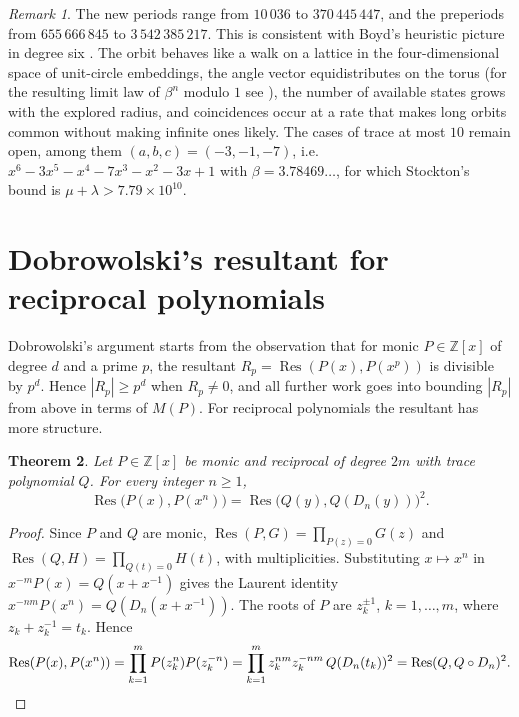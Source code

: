 \documentclass[11pt]{amsart}
\newtheorem{theorem}{Theorem}[section]
\theoremstyle{definition}
\theoremstyle{remark}
\newtheorem{remark}[theorem]{Remark}
\DeclareMathOperator{\Res}{Res}
\newcommand{\Z}{\mathbb Z}
\begin{document}
\begin{remark}
The new periods range from $10\,036$ to $370\,445\,447$, and the preperiods from $655\,666\,845$ to $3\,542\,385\,217$. This is consistent with Boyd's heuristic picture in degree six \cite{Boyd96}. The orbit behaves like a walk on a lattice in the four-dimensional space of unit-circle embeddings, the angle vector equidistributes on the torus (for the resulting limit law of $\beta^n$ modulo $1$ see \cite{AkiyamaTanigawa}), the number of available states grows with the explored radius, and coincidences occur at a rate that makes long orbits common without making infinite ones likely. The cases of trace at most $10$ remain open, among them $(a,b,c)=(-3,-1,-7)$, i.e.\ $x^6-3x^5-x^4-7x^3-x^2-3x+1$ with $\beta=3.78469\ldots$, for which Stockton's bound is $\mu+\lambda>7.79\times10^{10}$.
\end{remark}

\section{Dobrowolski's resultant for reciprocal polynomials}\label{sec:dob}

Dobrowolski's argument \cite{Dobrowolski} starts from the observation that for monic $P\in\Z[x]$ of degree $d$ and a prime $p$, the resultant $R_p=\Res(P(x),P(x^p))$ is divisible by $p^d$. Hence $|R_p|\ge p^d$ when $R_p\ne0$, and all further work goes into bounding $|R_p|$ from above in terms of $M(P)$. For reciprocal polynomials the resultant has more structure.

\begin{theorem}\label{thm:square}
Let $P\in\Z[x]$ be monic and reciprocal of degree $2m$ with trace polynomial $Q$. For every integer $n\ge1$,
\[
\Res\big(P(x),P(x^n)\big)=\Res\big(Q(y),Q(D_n(y))\big)^2.
\]
\end{theorem}
\begin{proof}
Since $P$ and $Q$ are monic, $\Res(P,G)=\prod_{P(z)=0}G(z)$ and $\Res(Q,H)=\prod_{Q(t)=0}H(t)$, with multiplicities. Substituting $x\mapsto x^n$ in $x^{-m}P(x)=Q(x+x^{-1})$ gives the Laurent identity $x^{-nm}P(x^n)=Q(D_n(x+x^{-1}))$. The roots of $P$ are $z_k^{\pm1}$, $k=1,\dots,m$, where $z_k+z_k^{-1}=t_k$. Hence
\[
\Res(P(x),P(x^n))=\prod_{k=1}^m P(z_k^n)P(z_k^{-n})
=\prod_{k=1}^m z_k^{nm}z_k^{-nm}\,Q(D_n(t_k))^2=\Res(Q,Q\circ D_n)^2.
\qedhere
\]
\end{proof}
\end{document}
